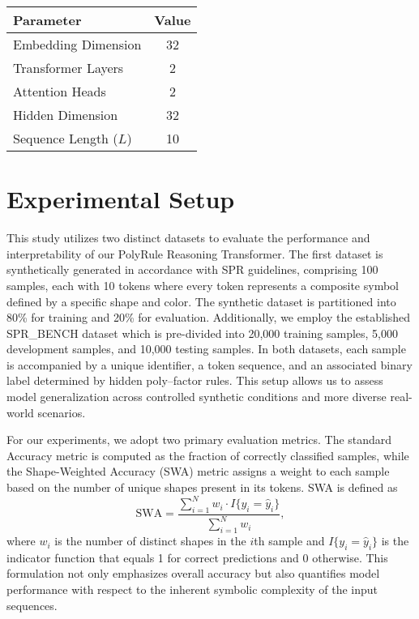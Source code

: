 \documentclass{article}
\begin{document}
\begin{table}[h]
\centering
\begin{tabular}{|l|c|}
\hline
\textbf{Parameter} & \textbf{Value} \\
\hline
Embedding Dimension & 32 \\
Transformer Layers & 2 \\
Attention Heads & 2 \\
Hidden Dimension & 32 \\
Sequence Length (\(L\)) & 10 \\
\hline
\end{tabular}
\label{tab:hyper}
\end{table}

\section{Experimental Setup}
This study utilizes two distinct datasets to evaluate the performance and interpretability of our PolyRule Reasoning Transformer. The first dataset is synthetically generated in accordance with SPR guidelines, comprising 100 samples, each with 10 tokens where every token represents a composite symbol defined by a specific shape and color. The synthetic dataset is partitioned into 80\% for training and 20\% for evaluation. Additionally, we employ the established SPR\_BENCH dataset which is pre-divided into 20,000 training samples, 5,000 development samples, and 10,000 testing samples. In both datasets, each sample is accompanied by a unique identifier, a token sequence, and an associated binary label determined by hidden poly–factor rules. This setup allows us to assess model generalization across controlled synthetic conditions and more diverse real-world scenarios.

For our experiments, we adopt two primary evaluation metrics. The standard Accuracy metric is computed as the fraction of correctly classified samples, while the Shape-Weighted Accuracy (SWA) metric assigns a weight to each sample based on the number of unique shapes present in its tokens. SWA is defined as
\[
\text{SWA} = \frac{\sum_{i=1}^{N} w_i \cdot I\{y_i = \hat{y}_i\}}{\sum_{i=1}^{N} w_i},
\]
where \(w_i\) is the number of distinct shapes in the \(i\)th sample and \(I\{y_i = \hat{y}_i\}\) is the indicator function that equals 1 for correct predictions and 0 otherwise. This formulation not only emphasizes overall accuracy but also quantifies model performance with respect to the inherent symbolic complexity of the input sequences.
\end{document}
